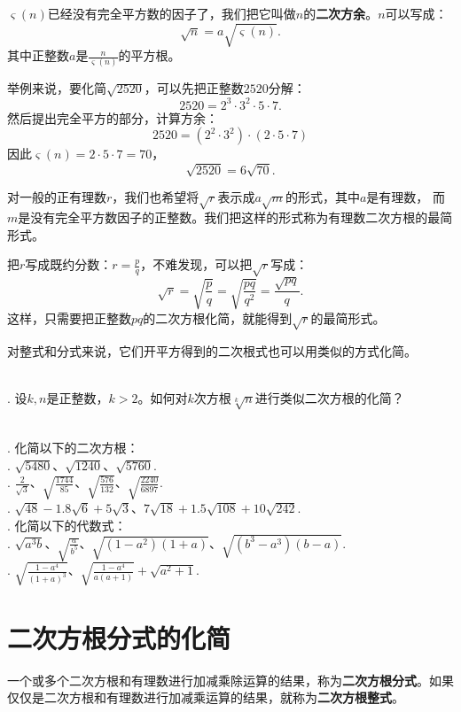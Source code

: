 \documentclass[12pt,UTF8]{ctexbook}
\begin{document}
$\varsigma(n)$已经没有完全平方数的因子了，我们把它叫做$n$的\textbf{二次方余}。$n$可以写成：
$$ \sqrt{n} = a\sqrt{\varsigma(n)}.$$
其中正整数$a$是$\frac{n}{\varsigma(n)}$的平方根。

举例来说，要化简$\sqrt{2520}$，可以先把正整数$2520$分解：
$$ 2520 = 2^3 \cdot 3^2 \cdot 5 \cdot 7.$$
然后提出完全平方的部分，计算方余：
$$ 2520 = \left(2^2 \cdot 3^2 \right) \cdot (2 \cdot 5 \cdot 7)$$
因此$\varsigma(n) = 2 \cdot 5 \cdot 7 = 70$，
$$ \sqrt{2520} = 6 \sqrt{70}.$$

对一般的正有理数$r$，我们也希望将$\sqrt{r}$表示成$a\sqrt{m}$的形式，其中$a$是有理数，
而$m$是没有完全平方数因子的正整数。我们把这样的形式称为有理数二次方根的最简形式。

把$r$写成既约分数：$r = \frac{p}{q}$，不难发现，可以把$\sqrt{r}$写成：
$$ \sqrt{r} = \sqrt{\frac{p}{q}} = \sqrt{\frac{pq}{q^2}} = \frac{\sqrt{pq}}{q}.$$
这样，只需要把正整数$pq$的二次方根化简，就能得到$\sqrt{r}$的最简形式。

对整式和分式来说，它们开平方得到的二次根式也可以用类似的方式化简。

\begin{sk}
    \mbox{} \\
    . 设$k,n$是正整数，$k>2$。如何对$k$次方根$\sqrt[k]{n}$进行类似二次方根的化简？
\end{sk}

\begin{xt}\label{xt:3-0-0}
    \mbox{} \\
    . 化简以下的二次方根：\\
    . $\sqrt{5480}$、$\sqrt{1240}$、$\sqrt{5760}$.\\
    . $\displaystyle\frac{2}{\sqrt{3}}$、$\displaystyle\sqrt{\frac{1744}{85}}$、$\displaystyle\sqrt{\frac{576}{132}}$、$\displaystyle\sqrt{\frac{2240}{6897}}$.\\
    . $\sqrt{48} - 1.8\sqrt{6} + 5\sqrt{3}$、$7\sqrt{18} + 1.5\sqrt{108} + 10\sqrt{242}$.\\
    . 化简以下的代数式：\\
    . $\sqrt{a^3b}$、$\displaystyle\sqrt{\frac{a}{b^5}}$、$\sqrt{(1 - a^2)(1 + a)}$、$\sqrt{(b^3 - a^3)(b - a)}$.\\
    . $\displaystyle\sqrt{\frac{1 - a^4}{(1 + a)^3}}$、$\displaystyle\sqrt{\frac{1 - a^4}{a(a+1)}} + \sqrt{a^2+1}$.
\end{xt}

\section{二次方根分式的化简}
一个或多个二次方根和有理数进行加减乘除运算的结果，称为\textbf{二次方根分式}。如果仅仅是二次方根和有理数进行加减乘运算的结果，就称为\textbf{二次方根整式}。
\end{document}
